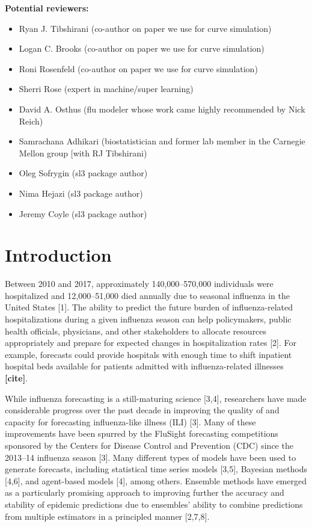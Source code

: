 \documentclass[10pt,letterpaper]{article}
\providecommand{\tightlist}{%
  \setlength{\itemsep}{0pt}\setlength{\parskip}{0pt}}
\begin{document}
\noindent \textbf{Potential reviewers:}

\begin{itemize}
\tightlist
\item
  Ryan J. Tibshirani (co-author on paper we use for curve simulation)
\item
  Logan C. Brooks (co-author on paper we use for curve simulation)
\item
  Roni Rosenfeld (co-author on paper we use for curve simulation)
\item
  Sherri Rose (expert in machine/super learning)
\item
  David A. Osthus (flu modeler whose work came highly recommended by
  Nick Reich)
\item
  Samrachana Adhikari (biostatistician and former lab member in the
  Carnegie Mellon group {[}with RJ Tibshirani)
\item
  Oleg Sofrygin (sl3 package author)
\item
  Nima Hejazi (sl3 package author)
\item
  Jeremy Coyle (sl3 package author)
\end{itemize}

\hypertarget{introduction}{%
\section{Introduction}\label{introduction}}

Between 2010 and 2017, approximately 140,000--570,000 individuals were
hospitalized and 12,000--51,000 died annually due to seasonal influenza
in the United States {[}1{]}. The ability to predict the future burden
of influenza-related hospitalizations during a given influenza season
can help policymakers, public health officials, physicians, and other
stakeholders to allocate resources appropriately and prepare for
expected changes in hospitalization rates {[}2{]}. For example,
forecasts could provide hospitals with enough time to shift inpatient
hospital beds available for patients admitted with influenza-related
illnesses \textbf{{[}cite{]}}.

While influenza forecasting is a still-maturing science {[}3,4{]},
researchers have made considerable progress over the past decade in
improving the quality of and capacity for forecasting influenza-like
illness (ILI) {[}3{]}. Many of these improvements have been spurred by
the FluSight forecasting competitions sponsored by the Centers for
Disease Control and Prevention (CDC) since the 2013--14 influenza season
{[}3{]}. Many different types of models have been used to generate
forecasts, including statistical time series models {[}3,5{]}, Bayesian
methods {[}4,6{]}, and agent-based models {[}4{]}, among others.
Ensemble methods have emerged as a particularly promising approach to
improving further the accuracy and stability of epidemic predictions due
to ensembles' ability to combine predictions from multiple estimators in
a principled manner {[}2,7,8{]}.
\end{document}
